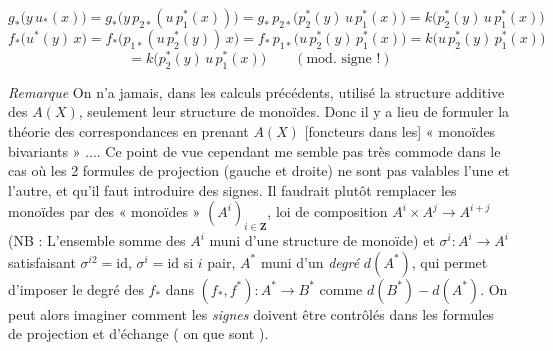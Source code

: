 \documentclass[11pt,a4paper]{article}
\begin{document}



\[
g_{*}\bigl( y\, u_{*}(x) \bigr) = g_{*}\bigl( y\, p_{2*}( u\, p_{1}^{*}(x) ) \bigr) = g_{*}\, p_{2*}\bigl( p_{2}^{*}(y)\, u\, p_{1}^{*}(x) \bigr) = k\bigl( p_{2}^{*}(y)\, u\, p_{1}^{*}(x) \bigr)
\]
\[
f_{*}\bigl( u^{*}(y)\, x \bigr) = f_{*}\bigl( p_{1*}( u\, p_{2}^{*}(y) )\, x \bigr) = f_{*}\, p_{1*}\bigl( u\, p_{2}^{*}(y)\, p_{1}^{*}(x) \bigr) = k\bigl( u\, p_{2}^{*}(y)\, p_{1}^{*}(x) \bigr)
\]
\[
= k\bigl( p_{2}^{*}(y)\, u\, p_{1}^{*}(x) \bigr) \qquad (\text{mod.\ signe !})
\]


\emph{Remarque} On n'a jamais, dans les calculs précédents, utilisé la
structure additive des $A(X)$, seulement leur structure de monoïdes. Donc il y
a lieu de formuler la théorie des correspondances en prenant  $A(X)$  [foncteurs dans les] « monoïdes
bivariants » ....  Ce point de vue cependant me semble pas très
commode dans le cas où les 2 formules de projection (gauche et droite) ne sont
pas valables l'une et l'autre, et qu'il faut introduire des signes. Il
faudrait plutôt remplacer les monoïdes par des « monoïdes
 » $(A^{i})_{i \in \mathbf{Z}}$, loi de composition
$A^{i} \times A^{j} \to A^{i+j}$ (NB : L'ensemble somme des $A^{i}$
 muni d'une structure de monoïde) et \struck{\ill{}}
 \struck{\ill{}} 
$\sigma^{i} \colon A^{i} \to A^{i}$ satisfaisant $\sigma^{i2} = \mathrm{id}$,
$\sigma^{i} = \mathrm{id}$ si $i$ pair,  
$A^{*}$ muni d'un \emph{degré} $d(A^{*})$, qui permet d'imposer le degré des
$f_{*}$ dans $(f_{*}, f^{*}) \colon A^{*} \to B^{*}$ comme
$d(B^{*}) - d(A^{*})$. On peut alors imaginer comment les \emph{signes} doivent
être contrôlés dans les formules de projection et d'échange
(\ill{} on  que \ill{} sont \ill{}).
\end{document}
